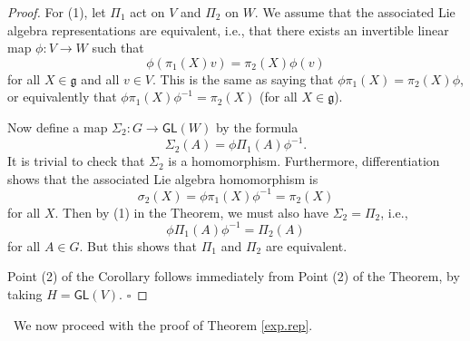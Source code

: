 \documentclass[12pt]{amsbook}
\let \frak = \mathfrak
\theoremstyle{plain}
\numberwithin{equation}{chapter}
\numberwithin{theorem}{chapter}
\begin{document}
\begin{proof}
For (1), let $\Pi_{1}$ act on $V$ and $\Pi_{2}$ on $W$. We assume that the
associated Lie algebra representations are equivalent, i.e., that there exists
an invertible linear map $\phi:V\rightarrow W$ such that
\[
\phi\left(  \pi_{1}(X)v\right)  =\pi_{2}(X)\phi(v)
\]
for all $X\in\frak{g}$ and all $v\in V$. This is the same as saying that
$\phi\pi_{1}(X)=\pi_{2}(X)\phi$, or equivalently that $\phi\pi_{1}(X)\phi
^{-1}=\pi_{2}(X)$ (for all $X\in\frak{g}$).

Now define a map $\Sigma_{2}:G\rightarrow\mathsf{GL}(W)$ by the formula
\[
\Sigma_{2}(A)=\phi\Pi_{1}(A)\phi^{-1}\text{.}%
\]
It is trivial to check that $\Sigma_{2}$ is a homomorphism. Furthermore,
differentiation shows that the associated Lie algebra homomorphism is
\[
\sigma_{2}(X)=\phi\pi_{1}(X)\phi^{-1}=\pi_{2}(X)
\]
for all $X$. Then by (1) in the Theorem, we must also have $\Sigma_{2}=\Pi
_{2}$, i.e.,
\[
\phi\Pi_{1}(A)\phi^{-1}=\Pi_{2}(A)
\]
for all $A\in G$. But this shows that $\Pi_{1}$ and $\Pi_{2}$ are equivalent.

Point (2) of the Corollary follows immediately from Point (2) of the Theorem,
by taking $H=\mathsf{GL}(V)$. $\square$
\end{proof}

\ We now proceed with the proof of Theorem \ref{exp.rep}.
\end{document}
